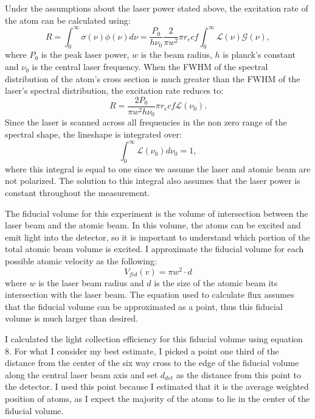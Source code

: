 \documentclass[12pt, a4paper]{article}
\begin{document}
Under the assumptions about the laser power stated above, the excitation rate of the atom can be calculated using:
\begin{equation}
R = \int_{0}^{\infty}\sigma(\nu) \phi(\nu)d\nu = \frac{P_0}{h \nu_0} \frac{2}{\pi w^2} \pi r_e c f \int_{0}^{\infty} \mathscr{L}(\nu) \mathscr{G}(\nu),
\end{equation}
where $P_0$ is the peak laser power, $w$ is the beam radius, $h$ is planck's constant and $\nu_0$ is the central laser frequency. When the FWHM of the spectral distribution of the atom's cross section is much greater than the FWHM of the laser's spectral distribution, the excitation rate reduces to:
\begin{equation}
R =\frac{2P_0}{\pi w^2 h \nu_0} \pi r_e c f \mathscr{L} (\nu_0).
\end{equation}
Since the laser is scanned across all frequencies in the non zero range of the spectral shape, the lineshape is integrated over:
\begin{equation}
\int_0^{\infty}\mathscr{L} (\nu_0)d\nu_0 = 1,
\end{equation}
where this integral is equal to one since we assume the laser and atomic beam are not polarized. The solution to this integral also assumes that the laser power is constant throughout the measurement.


The fiducial volume for this experiment is the volume of intersection between the laser beam and the atomic beam. In this volume, the atoms can be excited and emit light into the detector, so it is important to understand which portion of the total atomic beam volume is excited. I approximate the fiducial volume for each possible atomic velocity as the following:
\begin{equation}
V_{fid}(v) = \pi w^2\cdot d
\end{equation}
where $w$ is the laser beam radius and $d$ is the size of the atomic beam its intersection with the laser beam. The equation used to calculate flux assumes that the fiducial volume can be approximated as a point, thus this fiducial volume is much larger than desired. 

I calculated the light collection efficiency for this fiducial volume using equation 8. For what I consider my best estimate, I picked a point one third of the distance from the center of the six way cross to the edge of the fiducial volume along the central laser beam axis and set $d_{det}$ as the distance from this point to the detector. I used this point because I estimated that it is the average weighted position of atoms, as I expect the majority of the atoms to lie in the center of the fiducial volume.
\end{document}
